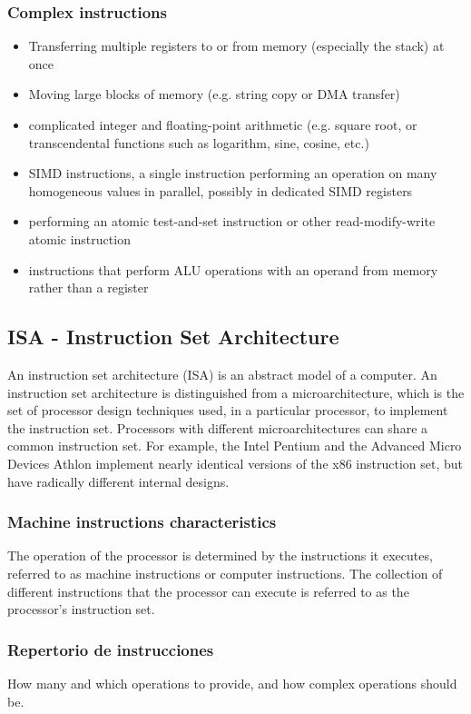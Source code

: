 \subsubsection{Complex instructions}
\begin{itemize}
	\item Transferring multiple registers to or from memory (especially the stack) at once
	\item Moving large blocks of memory (e.g. string copy or DMA transfer)
	\item complicated integer and floating-point arithmetic (e.g. square root, or transcendental functions such as logarithm, sine, cosine, etc.)
	\item SIMD instructions, a single instruction performing an operation on many homogeneous values in parallel, possibly in dedicated SIMD registers
	\item performing an atomic test-and-set instruction or other read-modify-write atomic instruction
	\item instructions that perform ALU operations with an operand from memory rather than a register
\end{itemize}


\subsection{ISA - Instruction Set Architecture}
An instruction set architecture (ISA) is an abstract model of a computer. An instruction set architecture is distinguished from a microarchitecture, which is the set of processor design techniques used, in a particular processor, to implement the instruction set. Processors with different microarchitectures can share a common instruction set. For example, the Intel Pentium and the Advanced Micro Devices Athlon implement nearly identical versions of the x86 instruction set, but have radically different internal designs.

\subsubsection{Machine instructions characteristics}
The operation of the processor is determined by the instructions it executes, referred to as machine instructions or computer instructions. The collection of different instructions that the processor can execute is referred to as the processor’s instruction set.

\subsubsection{Repertorio de instrucciones}
How many and which operations to provide, and how complex operations should be.

